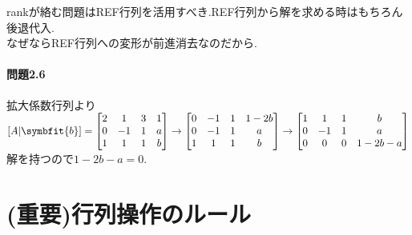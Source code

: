 rankが絡む問題はREF行列を活用すべき.REF行列から解を求める時はもちろん後退代入.\\なぜならREF行列への変形が前進消去なのだから.\\
\paragraph{問題2.6}
拡大係数行列より\\
$[A|\symbfit{b}]=
\begin{bmatrix}
    2 & 1 & 3 & 1\\
    0 & -1 & 1 & a\\
    1 & 1 & 1 & b
\end{bmatrix}\rightarrow
\begin{bmatrix}
    0 & -1 & 1 & 1-2b \\
    0 & -1 & 1 & a \\
    1 & 1 & 1 & b
\end{bmatrix} \rightarrow
\begin{bmatrix}
    1 & 1 & 1 & b \\
    0 & -1 & 1 & a \\
    0 & 0 & 0 & 1-2b-a
\end{bmatrix}$\\
解を持つので$1-2b-a=0.$
\section{(重要)行列操作のルール}\label{sec:matrixRule}
